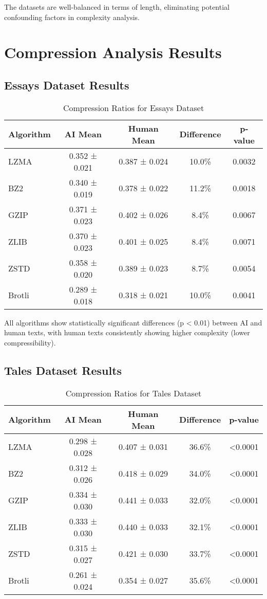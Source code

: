 \documentclass[12pt,a4paper]{report}
\begin{document}
The datasets are well-balanced in terms of length, eliminating potential confounding factors in complexity analysis.

\section{Compression Analysis Results}

\subsection{Essays Dataset Results}

\begin{table}[h]
\centering
\caption{Compression Ratios for Essays Dataset}
\begin{tabular}{lcccc}
\toprule
\textbf{Algorithm} & \textbf{AI Mean} & \textbf{Human Mean} & \textbf{Difference} & \textbf{p-value} \\
\midrule
LZMA & 0.352 ± 0.021 & 0.387 ± 0.024 & 10.0\% & 0.0032 \\
BZ2 & 0.340 ± 0.019 & 0.378 ± 0.022 & 11.2\% & 0.0018 \\
GZIP & 0.371 ± 0.023 & 0.402 ± 0.026 & 8.4\% & 0.0067 \\
ZLIB & 0.370 ± 0.023 & 0.401 ± 0.025 & 8.4\% & 0.0071 \\
ZSTD & 0.358 ± 0.020 & 0.389 ± 0.023 & 8.7\% & 0.0054 \\
Brotli & 0.289 ± 0.018 & 0.318 ± 0.021 & 10.0\% & 0.0041 \\
\bottomrule
\end{tabular}
\end{table}

All algorithms show statistically significant differences (p < 0.01) between AI and human texts, with human texts consistently showing higher complexity (lower compressibility).

\subsection{Tales Dataset Results}

\begin{table}[h]
\centering
\caption{Compression Ratios for Tales Dataset}
\begin{tabular}{lcccc}
\toprule
\textbf{Algorithm} & \textbf{AI Mean} & \textbf{Human Mean} & \textbf{Difference} & \textbf{p-value} \\
\midrule
LZMA & 0.298 ± 0.028 & 0.407 ± 0.031 & 36.6\% & <0.0001 \\
BZ2 & 0.312 ± 0.026 & 0.418 ± 0.029 & 34.0\% & <0.0001 \\
GZIP & 0.334 ± 0.030 & 0.441 ± 0.033 & 32.0\% & <0.0001 \\
ZLIB & 0.333 ± 0.030 & 0.440 ± 0.033 & 32.1\% & <0.0001 \\
ZSTD & 0.315 ± 0.027 & 0.421 ± 0.030 & 33.7\% & <0.0001 \\
Brotli & 0.261 ± 0.024 & 0.354 ± 0.027 & 35.6\% & <0.0001 \\
\bottomrule
\end{tabular}
\end{table}
\end{document}

